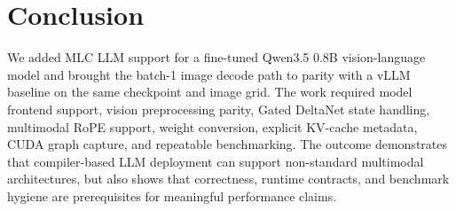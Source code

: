 \documentclass[10pt]{article}
\begin{document}
\section{Conclusion}

We added MLC LLM support for a fine-tuned Qwen3.5 0.8B vision-language model
and brought the batch-1 image decode path to parity with a vLLM baseline on the
same checkpoint and image grid. The work required model frontend support,
vision preprocessing parity, Gated DeltaNet state handling, multimodal RoPE
support, weight conversion, explicit KV-cache metadata, CUDA graph capture, and
repeatable benchmarking. The outcome demonstrates that compiler-based LLM
deployment can support non-standard multimodal architectures, but also shows
that correctness, runtime contracts, and benchmark hygiene are prerequisites for
meaningful performance claims.



\end{document}

